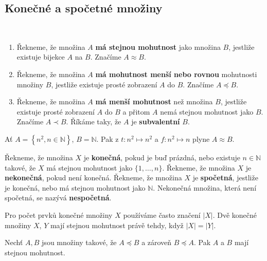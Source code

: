 \subsection{Konečné a spočetné množiny}
\begin{definice}
	\,
	\begin{enumerate}
    \item[(a)] Řekneme, že množina $A$ \textbf{má stejnou mohutnost} jako množina $B$, jestliže existuje
    bijekce $A$ na $B$. Značíme $A\approx B$.
    \item[(b)] Řekneme, že množina $A$ \textbf{má mohutnost menší nebo rovnou} mohutnosti množiny $B$,
    jestliže existuje prosté zobrazení $A$ do $B$. Značíme $A\preceq B$.
    \item[(c)] Řekneme, že množina $A$ \textbf{má menší mohutnost} než množina $B$, jestliže existuje
    prosté zobrazení $A$ do $B$ a přitom $A$ nemá stejnou mohutnost jako $B$. Značíme $A\prec B$.
    Říkáme taky, že $A$ je \textbf{subvalentní} $B$.
    \end{enumerate}
\end{definice}

\begin{priklad}
	Ať $A = \left \{ n^2, n \in \mathbb N  \right \} $, $B=\mathbb N $. Pak z $t:n^2\mapsto n^2$ a $f: n^2\mapsto n$ plyne
	$A\approx B$.
\end{priklad}

\begin{definice}
Řekneme, že množina $X$ je \textbf{konečná}, pokud je buď prázdná, nebo existuje
$n\in\mathbb{N}$ takové, že $X$ má stejnou mohutnost jako $\{1,\dots,n\}$.
Řekneme, že množina $X$ je \textbf{nekonečná}, pokud není konečná.
Řekneme, že množina $X$ je \textbf{spočetná}, jestliže je konečná, nebo má stejnou mohutnost jako
$\mathbb{N}$. Nekonečná množina, která není spočetná, se nazývá \textbf{nespočetná}.
\end{definice}

\begin{poznamka}
	Pro počet prvků konečné množiny $X$ používáme často značení $|X|$.
	Dvě konečné množiny $X$, $Y$ mají stejnou mohutnost právě tehdy, když $|X|=|Y|$.
\end{poznamka}

\begin{veta} \label{veta1.3}
Nechť $A,B$ jsou množiny takové, že $A\preceq B$ a zároveň $B\preceq A$.
Pak $A$ a $B$ mají stejnou mohutnost.
\end{veta}

